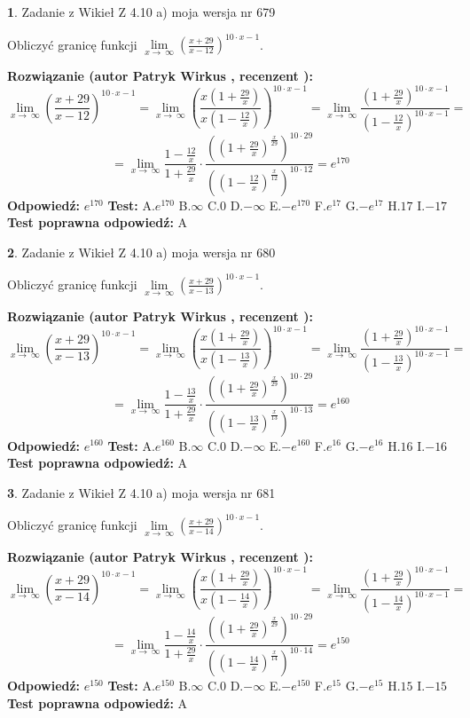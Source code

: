 \documentclass[12pt, a4paper]{article}
\theoremstyle{definition} %
\newtheorem{zad}{}
\newcommand{\zadStart}[1]{\begin{zad}#1\newline}
\newcommand{\zadStop}{\end{zad}}
\newcommand{\rozwStart}[2]{\noindent \textbf{Rozwiązanie (autor #1 , recenzent #2): }\newline}
\newcommand{\rozwStop}{\newline}
\newcommand{\odpStart}{\noindent \textbf{Odpowiedź:}\newline}
\newcommand{\odpStop}{\newline}
\newcommand{\testStart}{\noindent \textbf{Test:}\newline}
\newcommand{\testStop}{\newline}
\newcommand{\kluczStart}{\noindent \textbf{Test poprawna odpowiedź:}\newline}
\newcommand{\kluczStop}{\newline}
\begin{document}
\zadStart{Zadanie z Wikieł Z 4.10 a) moja wersja nr 679}

Obliczyć granicę funkcji  $\lim\limits_{x\to\ \infty}(\frac{x+29}{x-12})^{10\cdot x-1}$.
\zadStop
\rozwStart{Patryk Wirkus}{}
$$\lim\limits_{x\to\ \infty}(\frac{x+29}{x-12})^{10\cdot x-1} = \lim\limits_{x\to\ \infty}(\frac{x(1+\frac{29}{x})}{x(1-\frac{12}{x})})^{10\cdot x-1}=\lim\limits_{x\to\ \infty}\frac{(1+\frac{29}{x})^{10\cdot x-1}}{(1-\frac{12}{x})^{10\cdot x-1}}=$$
$$=\lim\limits_{x\to\ \infty}\frac{1-\frac{12}{x}}{1+\frac{29}{x}}\cdot\frac{((1+\frac{29}{x})^{\frac{x}{29}})^{10\cdot29}}{((1-\frac{12}{x})^{\frac{x}{12}})^{10\cdot12}}=e^{170}$$
\rozwStop
\odpStart
$e^{170}$
\odpStop
\testStart
A.$e^{170}$ B.$\infty$ C.$0$ D.$-\infty$ E.$-e^{170}$
F.$e^{17}$ G.$-e^{17}$
H.$17$
I.$-17$
\testStop
\kluczStart
A
\kluczStop



\zadStart{Zadanie z Wikieł Z 4.10 a) moja wersja nr 680}

Obliczyć granicę funkcji  $\lim\limits_{x\to\ \infty}(\frac{x+29}{x-13})^{10\cdot x-1}$.
\zadStop
\rozwStart{Patryk Wirkus}{}
$$\lim\limits_{x\to\ \infty}(\frac{x+29}{x-13})^{10\cdot x-1} = \lim\limits_{x\to\ \infty}(\frac{x(1+\frac{29}{x})}{x(1-\frac{13}{x})})^{10\cdot x-1}=\lim\limits_{x\to\ \infty}\frac{(1+\frac{29}{x})^{10\cdot x-1}}{(1-\frac{13}{x})^{10\cdot x-1}}=$$
$$=\lim\limits_{x\to\ \infty}\frac{1-\frac{13}{x}}{1+\frac{29}{x}}\cdot\frac{((1+\frac{29}{x})^{\frac{x}{29}})^{10\cdot29}}{((1-\frac{13}{x})^{\frac{x}{13}})^{10\cdot13}}=e^{160}$$
\rozwStop
\odpStart
$e^{160}$
\odpStop
\testStart
A.$e^{160}$ B.$\infty$ C.$0$ D.$-\infty$ E.$-e^{160}$
F.$e^{16}$ G.$-e^{16}$
H.$16$
I.$-16$
\testStop
\kluczStart
A
\kluczStop



\zadStart{Zadanie z Wikieł Z 4.10 a) moja wersja nr 681}

Obliczyć granicę funkcji  $\lim\limits_{x\to\ \infty}(\frac{x+29}{x-14})^{10\cdot x-1}$.
\zadStop
\rozwStart{Patryk Wirkus}{}
$$\lim\limits_{x\to\ \infty}(\frac{x+29}{x-14})^{10\cdot x-1} = \lim\limits_{x\to\ \infty}(\frac{x(1+\frac{29}{x})}{x(1-\frac{14}{x})})^{10\cdot x-1}=\lim\limits_{x\to\ \infty}\frac{(1+\frac{29}{x})^{10\cdot x-1}}{(1-\frac{14}{x})^{10\cdot x-1}}=$$
$$=\lim\limits_{x\to\ \infty}\frac{1-\frac{14}{x}}{1+\frac{29}{x}}\cdot\frac{((1+\frac{29}{x})^{\frac{x}{29}})^{10\cdot29}}{((1-\frac{14}{x})^{\frac{x}{14}})^{10\cdot14}}=e^{150}$$
\rozwStop
\odpStart
$e^{150}$
\odpStop
\testStart
A.$e^{150}$ B.$\infty$ C.$0$ D.$-\infty$ E.$-e^{150}$
F.$e^{15}$ G.$-e^{15}$
H.$15$
I.$-15$
\testStop
\kluczStart
A
\kluczStop
\end{document}
